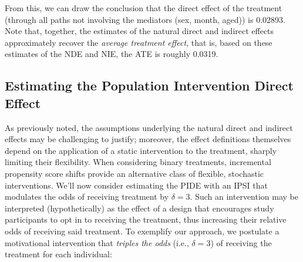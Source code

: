 \documentclass[12pt, krantz2,]{krantz}
\newenvironment{Shaded}{\begin{snugshade}}{\end{snugshade}}
\newcommand{\DataTypeTok}[1]{\textcolor[rgb]{0.27,0.27,0.27}{#1}}
\newcommand{\DecValTok}[1]{\textcolor[rgb]{0.06,0.06,0.06}{#1}}
\newcommand{\FloatTok}[1]{\textcolor[rgb]{0.06,0.06,0.06}{#1}}
\newcommand{\KeywordTok}[1]{\textcolor[rgb]{0.27,0.27,0.27}{\textbf{#1}}}
\newcommand{\NormalTok}[1]{#1}
\newcommand{\OperatorTok}[1]{\textcolor[rgb]{0.43,0.43,0.43}{\textbf{#1}}}
\newcommand{\OtherTok}[1]{\textcolor[rgb]{0.37,0.37,0.37}{#1}}
\newcommand{\StringTok}[1]{\textcolor[rgb]{0.5,0.5,0.5}{#1}}
\theoremstyle{definition}
\theoremstyle{definition}
\theoremstyle{definition}
\newcommand{\1}{\mathbbm{1}}
\begin{document}
\begin{Shaded}
\end{Shaded}

From this, we can draw the conclusion that the direct effect of the treatment
(through all paths not involving the mediators (sex, month, aged)) is
0.02893. Note that, together, the estimates of
the natural direct and indirect effects approximately recover the \emph{average
treatment effect}, that is, based on these estimates of the NDE and NIE, the
ATE is roughly
0.0319.

\hypertarget{estimating-the-population-intervention-direct-effect}{%
\subsection{Estimating the Population Intervention Direct Effect}\label{estimating-the-population-intervention-direct-effect}}

As previously noted, the assumptions underlying the natural direct and indirect
effects may be challenging to justify; moreover, the effect definitions
themselves depend on the application of a static intervention to the treatment,
sharply limiting their flexibility. When considering binary treatments,
incremental propensity score shifts provide an alternative class of flexible,
stochastic interventions. We'll now consider estimating the PIDE with an IPSI
that modulates the odds of receiving treatment by \(\delta = 3\). Such an
intervention may be interpreted (hypothetically) as the effect of a design that
encourages study participants to opt in to receiving the treatment, thus
increasing their relative odds of receiving said treatment. To exemplify our
approach, we postulate a motivational intervention that \emph{triples the odds}
(i.e., \(\delta = 3\)) of receiving the treatment for each individual:
\end{document}
